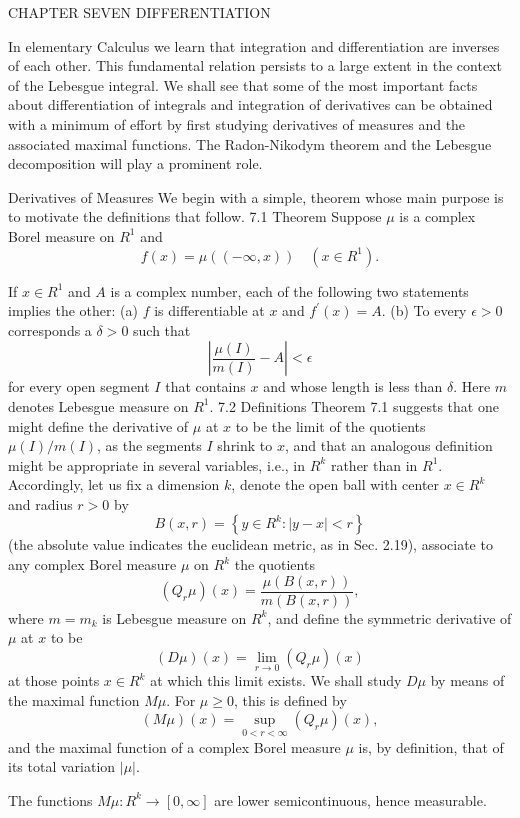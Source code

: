 CHAPTER
SEVEN
DIFFERENTIATION

In elementary Calculus we learn that integration and differentiation are inverses of each other. This fundamental relation persists to a large extent in the context of the Lebesgue integral. We shall see that some of the most important facts about differentiation of integrals and integration of derivatives can be obtained with a minimum of effort by first studying derivatives of measures and the associated maximal functions. The Radon-Nikodym theorem and the Lebesgue decomposition will play a prominent role.

Derivatives of Measures
We begin with a simple, theorem whose main purpose is to motivate the definitions that follow.
7.1 Theorem Suppose $\mu$ is a complex Borel measure on $R^1$ and
$$
f(x)=\mu((-\infty, x)) \quad\left(x \in R^1\right) .
$$

If $x \in R^1$ and $A$ is a complex number, each of the following two statements implies the other:
(a) $f$ is differentiable at $x$ and $f^{\prime}(x)=A$.
(b) To every $\epsilon>0$ corresponds a $\delta>0$ such that
$$
\left|\frac{\mu(I)}{m(I)}-A\right|<\epsilon
$$
for every open segment $I$ that contains $x$ and whose length is less than $\delta$. Here $m$ denotes Lebesgue measure on $R^1$.
7.2 Definitions Theorem 7.1 suggests that one might define the derivative of $\mu$ at $x$ to be the limit of the quotients $\mu(I) / m(I)$, as the segments $I$ shrink to $x$, and that an analogous definition might be appropriate in several variables, i.e., in $R^k$ rather than in $R^1$.
Accordingly, let us fix a dimension $k$, denote the open ball with center $x \in R^k$ and radius $r>0$ by
$$
B(x, r)=\left\{y \in R^k:|y-x|<r\right\}
$$
(the absolute value indicates the euclidean metric, as in Sec. 2.19), associate to any complex Borel measure $\mu$ on $R^k$ the quotients
$$
\left(Q_r \mu\right)(x)=\frac{\mu(B(x, r))}{m(B(x, r))},
$$
where $m=m_k$ is Lebesgue measure on $R^k$, and define the symmetric derivative of $\mu$ at $x$ to be
$$
(D \mu)(x)=\lim _{r \rightarrow 0}\left(Q_r \mu\right)(x)
$$
at those points $x \in R^k$ at which this limit exists.
We shall study $D \mu$ by means of the maximal function $M \mu$. For $\mu \geq 0$, this is defined by
$$
(M \mu)(x)=\sup _{0<r<\infty}\left(Q_r \mu\right)(x),
$$
and the maximal function of a complex Borel measure $\mu$ is, by definition, that of its total variation $|\mu|$.

The functions $M \mu: R^k \rightarrow[0, \infty]$ are lower semicontinuous, hence measurable.

